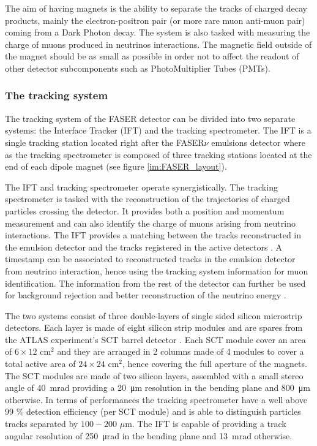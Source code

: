 			The aim of having magnets is the ability to separate the tracks of charged decay products, mainly the electron-positron pair (or more rare muon anti-muon pair) coming from a Dark Photon decay. The system is also tasked with measuring the charge of muons produced in neutrinos interactions. The magnetic field outside of the magnet should be as small as possible in order not to affect the readout of other detector subcomponents such as PhotoMultiplier Tubes (PMTs). 
		
			\subsubsection{The tracking system}
			The tracking system of the FASER detector can be divided into two separate systems: the Interface Tracker (IFT) and the tracking spectrometer. The IFT is a single tracking station located right after the FASER$\nu$ emulsions detector where as the tracking spectrometer is composed of three tracking stations located at the end of each dipole magnet (see figure \ref{im:FASER_layout}). 
			
			The IFT and tracking spectrometer operate synergistically. The tracking spectrometer is tasked with the reconstruction of the trajectories of charged particles crossing the detector. It provides both a position and momentum measurement and can also identify the charge of muons arising from neutrino interactions. The IFT provides a matching between the tracks reconstructed in the emulsion detector and the tracks registered in the active detectors \cite{FASER_Detector}. A timestamp can be associated to reconstructed tracks in the emulsion detector from neutrino interaction, hence using the tracking system information for muon identification. The information from the rest of the detector can further be used for background rejection and better reconstruction of the neutrino energy \cite{FASER_Detector}. 
			
			The two systems consist of three double-layers of single sided silicon microstrip detectors. Each layer is made of eight silicon strip modules and are spares from the ATLAS experiment's SCT barrel detector \cite{SCT_ATLAS}. Each SCT module cover an area of $6 \times 12$ cm$^2$ and they are arranged in 2 columns made of 4 modules to cover a total active area of $24 \times 24$  cm$^2$, hence covering the full aperture of the magnets. The SCT modules are made of two silicon layers, assembled with a small stereo angle of \SI{40}{\milli\radian} providing a \SI{20}{\micro\meter} resolution in the bending plane and \SI{800}{\micro\meter} otherwise. In terms of performances the tracking spectrometer have a well above 99 $\%$ detection efficiency (per SCT module) and is able to distinguish particles tracks separated by $100-200$ $\mu$m. The IFT is capable of providing a track angular resolution  of \SI{250}{\micro\radian} in the bending plane and \SI{13}{\milli\radian} otherwise.  
			  
